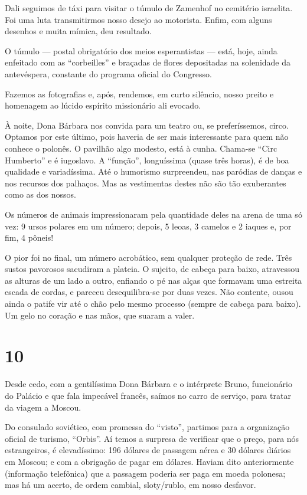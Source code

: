Dali seguimos de táxi para visitar o túmulo de Zamenhof no cemitério israelita. Foi uma luta transmitirmos nosso desejo ao motorista. Enfim, com alguns desenhos e muita mímica, deu resultado.

O túmulo --- postal obrigatório dos meios esperantistas --- está, hoje, ainda enfeitado com as ``corbeilles'' e braçadas de flores depositadas na solenidade da antevéspera, constante do programa oficial do Congresso.

Fazemos as fotografias e, após, rendemos, em curto silêncio, nosso preito e homenagem ao lúcido espírito missionário ali evocado.

À noite, Dona Bárbara nos convida para um teatro ou, se preferíssemos, circo. Optamos por este último, pois haveria de ser mais interessante para quem não conhece o polonês. O pavilhão algo modesto, está à cunha. Chama-se ``Circ Humberto'' e é iugoslavo. A ``função'', longuíssima (quase três horas), é de boa qualidade e variadíssima. Até o humorismo surpreendeu, nas paródias de danças e nos recursos dos palhaços. Mas as vestimentas destes não são tão exuberantes como as dos nossos.

Os números de animais impressionaram pela quantidade deles na arena de uma só vez: 9 ursos polares em um número; depois, 5 leoas, 3 camelos e 2 iaques e, por fim, 4 pôneis!

O pior foi no final, um número acrobático, sem qualquer proteção de rede. Três sustos pavorosos sacudiram a plateia. O sujeito, de cabeça para baixo, atravessou as alturas de um lado a outro, enfiando o pé nas alças que formavam uma estreita escada de cordas, e pareceu desequilibra-se por duas vezes. Não contente, ousou ainda o patife vir até o chão pelo mesmo processo (sempre de cabeça para baixo). Um gelo no coração e nas mãos, que suaram a valer.

\section*{10 \adfflatleafright {}}
Desde cedo, com a gentilíssima Dona Bárbara e o intérprete Bruno, funcionário do Palácio e que fala impecável francês, saímos no carro de serviço, para tratar da viagem a Moscou.

Do consulado soviético, com promessa do ``visto'', partimos para a organização oficial de turismo, ``Orbis''. Aí temos a surpresa de verificar que o preço, para nós estrangeiros, é elevadíssimo: 196 dólares de passagem aérea e 30 dólares diários em Moscou; e com a obrigação de pagar em dólares. Haviam dito anteriormente (informação telefônica) que a passagem poderia ser paga em moeda polonesa; mas há um acerto, de ordem cambial, sloty/rublo, em nosso desfavor.

